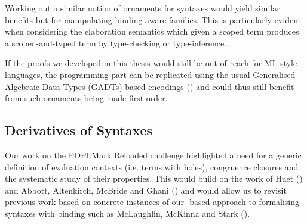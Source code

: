 Working out a similar notion of ornaments for syntaxes would yield similar
benefits but for manipulating binding-aware families. This is particularly
evident when considering the elaboration semantics which given a scoped term
produces a scoped-and-typed term by type-checking or type-inference.

If the proofs we developed in this thesis would still be out of reach for
ML-style languages, the programming part can be replicated using the usual
Generalised Algebraic Data Types (GADTs) based encodings
(\cite{danvytagless,lindley2014hasochism}) and could thus still benefit from
such ornaments being made first order.

\subsection{Derivatives of Syntaxes}

Our work on the POPLMark Reloaded challenge highlighted a need for a generic
definition of evaluation contexts (i.e. terms with holes), congruence closures
and the systematic study of their properties. This would build on the work of
Huet (\citeyear{huet_1997}) and Abbott, Altenkirch, McBride and Ghani
(\citeyear{abbott2005data}) and would allow us to revisit previous work
based on concrete instances of our -based approach to
formalising syntaxes with binding such as McLaughlin, McKinna and
Stark (\citeyear{craig2018triangle}).
